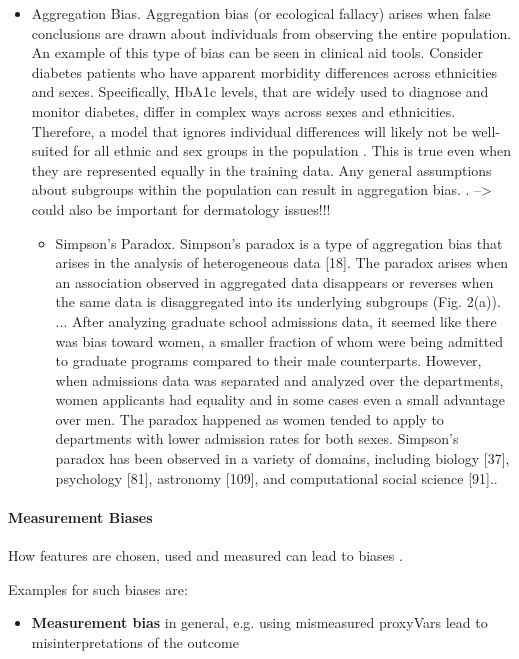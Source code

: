 \begin{refsection}
\begin{itemize}
			\item Aggregation Bias. Aggregation bias (or ecological fallacy) arises when false conclusions are drawn about individuals from observing the entire population. An example of this type of bias can be seen in clinical aid tools. Consider diabetes patients who have apparent morbidity differences across ethnicities and sexes. Specifically, HbA1c levels, that are widely used to diagnose and monitor diabetes, differ in complex ways across sexes and ethnicities. Therefore, a model that ignores individual differences will likely not be well-suited for all ethnic and sex groups in the population \autocite{M144_Suresh_2021}. This is true even when they are represented equally in the training data. Any general assumptions about subgroups within the population can result in aggregation bias. \autocite{Mehrabi_2021}. --> could also be important for dermatology issues!!!
			\begin{itemize}
				\item Simpson’s Paradox. Simpson’s paradox is a type of aggregation bias that arises in the analysis of heterogeneous data [18]. The paradox arises when an association observed in aggregated data disappears or reverses when the same data is disaggregated into its underlying subgroups (Fig. 2(a)). ... After analyzing graduate school admissions data, it seemed like there was bias toward women, a smaller fraction of whom were being admitted to graduate programs compared to their male counterparts. However, when admissions data was separated and analyzed over the departments, women applicants had equality and in some cases even a small advantage over men. The paradox happened as women tended to apply to departments with lower admission rates for both sexes. Simpson’s paradox has been observed in a variety of domains, including biology [37], psychology [81], astronomy [109], and computational social science [91].\autocite{Mehrabi_2021}.
			\end{itemize}
		\end{itemize}
		\rawcitationusedend
		\rawcitationend
		
		\paragraph{Measurement Biases}
		How features are chosen, used and measured can lead to biases \autocites{Mehrabi_2021}{M144_Suresh_2021}.
		
		Examples for such biases are:
		\begin{itemize}
			\item \textbf{Measurement bias} in general, e.g. using mismeasured \glspl{proxyVar} lead to misinterpretations of the outcome \autocite{Mehrabi_2021}
			

\end{itemize}
\end{refsection}
